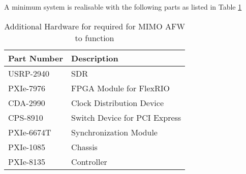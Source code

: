 A minimum system is realisable with the following parts as listed in Table \ref{tb:MIMOAFWPartsList}

\begin{table}[H]
    \begin{center}
        \begin{tabular}{|l|l|}
        \hline
            \textbf{Part Number} & \textbf{Description}          \\ \hline
            USRP-2940            & SDR                           \\ \hline
            PXIe-7976            & FPGA Module for FlexRIO       \\ \hline
            CDA-2990             & Clock Distribution Device     \\ \hline
            CPS-8910             & Switch Device for PCI Express \\ \hline
            PXIe-6674T           & Synchronization Module        \\ \hline
            PXIe-1085            & Chassis                       \\ \hline
            PXIe-8135            & Controller                    \\ \hline
        \end{tabular}
    \end{center}
    \caption{Additional Hardware for required for MIMO AFW to function}
    \label{tb:MIMOAFWPartsList}
\end{table}



